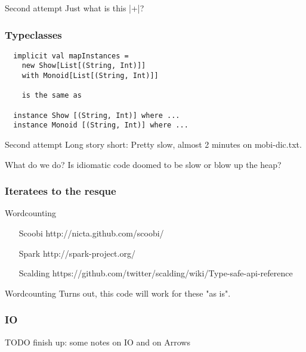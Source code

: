 \documentclass{beamer}
\begin{document}
\begin{frame}{Second attempt}
  Just what is this |+|?
\end{frame}

\begin{frame}[fragile]
\frametitle{Typeclasses}
\begin{lstlisting}
  implicit val mapInstances =
    new Show[List[(String, Int)]]
    with Monoid[List[(String, Int)]]

    is the same as

  instance Show [(String, Int)] where ...
  instance Monoid [(String, Int)] where ...
\end{lstlisting}
\end{frame}

\begin{frame}{Second attempt}
  Long story short:\newline
  Pretty slow, almost 2 minutes on mobi-dic.txt.
\end{frame}

\begin{frame}{What do we do?}
  Is idiomatic code doomed to be slow or blow up the heap?
\end{frame}

\begin{frame}[fragile]
\frametitle{Iteratees to the resque}
\end{frame}

\begin{frame}{Wordcounting}
\begin{enumerate}
  \item[Scoobi] http://nicta.github.com/scoobi/
  \item[Spark] http://spark-project.org/
  \item[Scalding] https://github.com/twitter/scalding/wiki/Type-safe-api-reference
\end{enumerate}
\end{frame}

\begin{frame}{Wordcounting}
  Turns out, this code will work for these "as is".
\end{frame}

\begin{frame}[fragile]
\frametitle{IO}
TODO finish up: some notes on IO and on Arrows
\end{frame}
\end{document}
